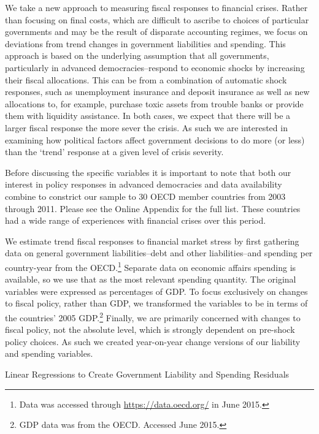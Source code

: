 \documentclass[]{article}
\begin{document}
We take a new approach to measuring fiscal responses to financial crises. Rather than focusing on final costs, which are difficult to ascribe to choices of particular governments and may be the result of disparate accounting regimes, we focus on deviations from trend changes in government liabilities and spending. This approach is based on the underlying assumption that all governments, particularly in advanced democracies--respond to economic shocks by increasing their fiscal allocations. This can be from a combination of automatic shock responses, such as unemployment insurance and deposit insurance as well as new allocations to, for example, purchase toxic assets from trouble banks or provide them with liquidity assistance. In both cases, we expect that there will be a larger fiscal response the more sever the crisis. As such we are interested in examining how political factors affect government decisions to do more (or less) than the `trend' response at a given level of crisis severity.

Before discussing the specific variables it is important to note that both our interest in policy responses in advanced democracies and data availability combine to constrict our sample to 30 OECD member countries from 2003 through 2011. Please see the Online Appendix for the full list. These countries had a wide range of experiences with financial crises over this period.

We estimate trend fiscal responses to financial market stress by first gathering data on general government liabilities--debt and other liabilities--and spending per country-year from the OECD.\footnote{Data was accessed through \url{https://data.oecd.org/} in June 2015.} Separate data on economic affairs spending is available, so we use that as the most relevant spending quantity. The original variables were expressed as percentages of GDP. To focus exclusively on changes to fiscal policy, rather than GDP, we transformed the variables to be in terms of the countries' 2005 GDP.\footnote{GDP data was from the OECD. Accessed June 2015.} Finally, we are primarily concerned with changes to fiscal policy, not the absolute level, which is strongly dependent on pre-shock policy choices. As such we created year-on-year change versions of our liability and spending variables.

\begin{table}
    \caption{Linear Regressions to Create Government Liability and Spending Residuals}
    \label{liab_resid}

    \begin{center}
        
    \end{center}

\end{table}
\end{document}
